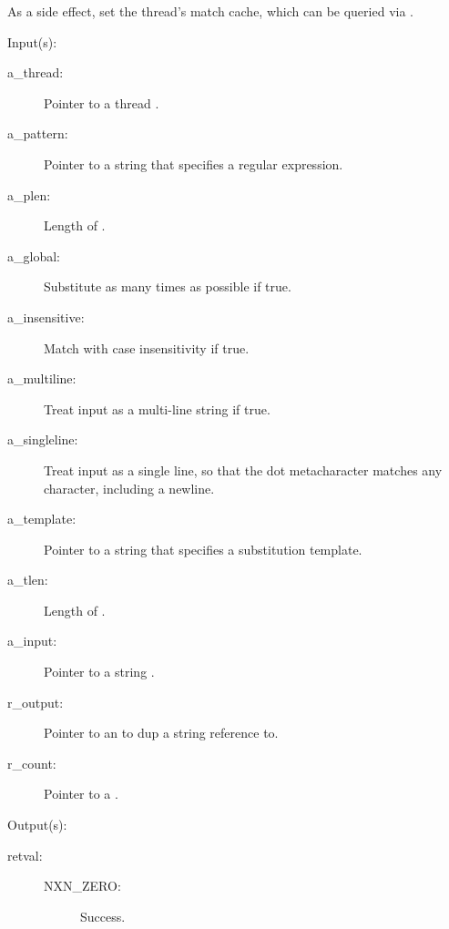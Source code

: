 \begin{capi}
\begin{capilist}
		As a side effect, set the thread's match cache, which can be
		queried via .
	\end{capilist}
\label{nxo_regsub_nonew_subst}
	\begin{capilist}
	\item[Input(s): ]
		\begin{description}\item[]
		\item[a\_thread: ]
			Pointer to a thread .
		\item[a\_pattern: ]
			Pointer to a string that specifies a regular expression.
		\item[a\_plen: ]
			Length of .
		\item[a\_global: ]
			Substitute as many times as possible if true.
		\item[a\_insensitive: ]
			Match with case insensitivity if true.
		\item[a\_multiline: ]
			Treat input as a multi-line string if true.
		\item[a\_singleline: ]
			Treat input as a single line, so that the dot
			metacharacter matches any character, including a
			newline.
		\item[a\_template: ]
			Pointer to a string that specifies a substitution
			template.
		\item[a\_tlen: ]
			Length of .
		\item[a\_input: ]
			Pointer to a string .
		\item[r\_output: ]
			Pointer to an  to dup a string reference
			to.
		\item[r\_count: ]
			Pointer to a .
		\end{description}
	\item[Output(s): ]
		\begin{description}\item[]
		\item[retval: ]
			\begin{description}\item[]
			\item[NXN\_ZERO: ] Success.

\end{description}
\end{description}
\end{capilist}
\end{capi}
